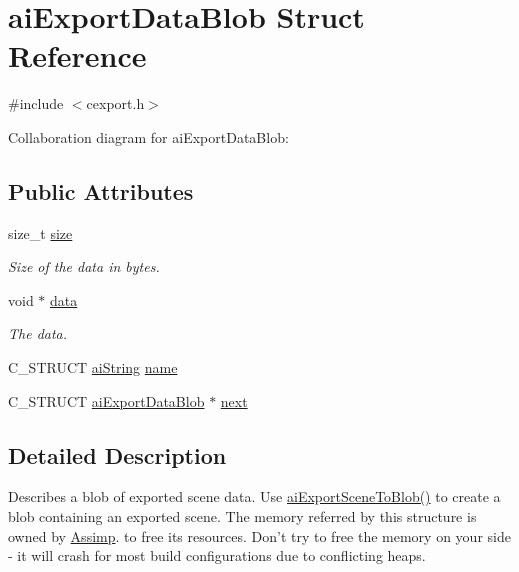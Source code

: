 \hypertarget{structai_export_data_blob}{\section{ai\-Export\-Data\-Blob Struct Reference}
\label{structai_export_data_blob}
}


{\ttfamily \#include $<$cexport.\-h$>$}



Collaboration diagram for ai\-Export\-Data\-Blob\-:
\subsection*{Public Attributes}
\begin{DoxyCompactItemize}
\item 
\hypertarget{structai_export_data_blob_a339bfaacc70396b2f99f94c1bc3b808f}{size\-\_\-t \hyperlink{structai_export_data_blob_a339bfaacc70396b2f99f94c1bc3b808f}{size}}\label{structai_export_data_blob_a339bfaacc70396b2f99f94c1bc3b808f}

\begin{DoxyCompactList}\small\item\em Size of the data in bytes. \end{DoxyCompactList}\item 
\hypertarget{structai_export_data_blob_ac080c780dad92077b42447d77a1a9ed1}{void $\ast$ \hyperlink{structai_export_data_blob_ac080c780dad92077b42447d77a1a9ed1}{data}}\label{structai_export_data_blob_ac080c780dad92077b42447d77a1a9ed1}

\begin{DoxyCompactList}\small\item\em The data. \end{DoxyCompactList}\item 
C\-\_\-\-S\-T\-R\-U\-C\-T \hyperlink{structai_string}{ai\-String} \hyperlink{structai_export_data_blob_af7f006ac5ad818c0d81d520a84f74c3e}{name}
\item 
C\-\_\-\-S\-T\-R\-U\-C\-T \hyperlink{structai_export_data_blob}{ai\-Export\-Data\-Blob} $\ast$ \hyperlink{structai_export_data_blob_a3e98fa760f45983ff1bccec6715f3817}{next}
\end{DoxyCompactItemize}


\subsection{Detailed Description}
Describes a blob of exported scene data. Use \hyperlink{cexport_8h_a33b02f2dbfd79980bf29e62f3a64139f}{ai\-Export\-Scene\-To\-Blob()} to create a blob containing an exported scene. The memory referred by this structure is owned by \hyperlink{namespace_assimp}{Assimp}. to free its resources. Don't try to free the memory on your side -\/ it will crash for most build configurations due to conflicting heaps.

